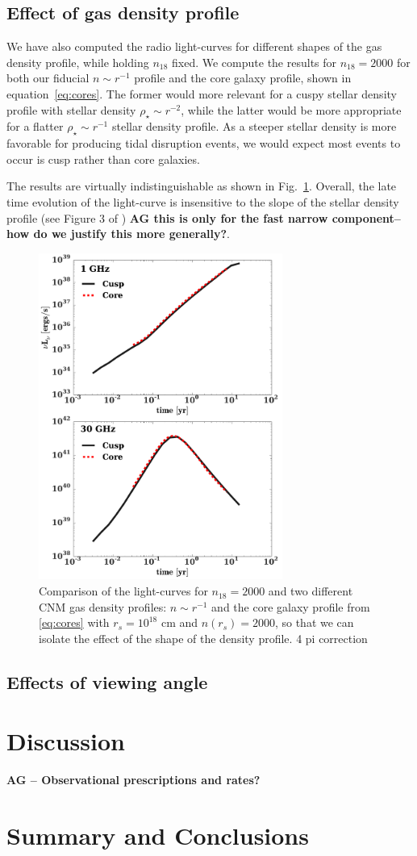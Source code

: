 \documentclass[usenatbib,fleqn]{mn2e}
\begin{document}
\subsection{Effect of gas density profile}
We have also computed the radio light-curves for different shapes of
the gas density profile, while holding $n_{18}$ fixed. We compute the
results for $n_{18}=2000$ for both our fiducial $n\sim r^{-1}$ profile and
the core galaxy profile, shown in equation~\eqref{eq:cores}. The
former would more relevant for a cuspy stellar density profile with
stellar density $\rho_{\star}\sim r^{-2}$, while the latter would be more
appropriate for a flatter $\rho_{\star}\sim r^{-1}$ stellar density
profile. As a steeper stellar density is more favorable for producing
tidal disruption events, we would expect most events to occur is cusp
rather than core galaxies.

The results are virtually indistinguishable as shown in
Fig.~\ref{fig:cores}. Overall, the late time evolution of the
light-curve is insensitive to the slope of the stellar density profile
(see Figure 3 of \citealt{Mimica+2015}) {\bf AG this is only for the
  fast narrow component--how do we justify this more generally?}.


\begin{figure} 
  \includegraphics[width=8cm]{fig_cores.pdf}
  \caption{\label{fig:cores} Comparison of the light-curves for
    $n_{18}=2000$ and two different CNM gas density profiles: $n\sim
    r^{-1}$ and the core galaxy profile from \eqref{eq:cores} with
    $r_s=10^{18}$ cm and $n(r_s)=2000$, so that we can isolate the
    effect of the shape of the density profile. 4 pi correction}
\end{figure}


\subsection{Effects of viewing angle}


\section{Discussion}
\label{sec:disc}
{\bf AG -- Observational prescriptions and rates?}

\section{Summary and Conclusions}
\label{sec:conc}

\clearpage
  \footnotesize{
    
    
  }
\end{document}
